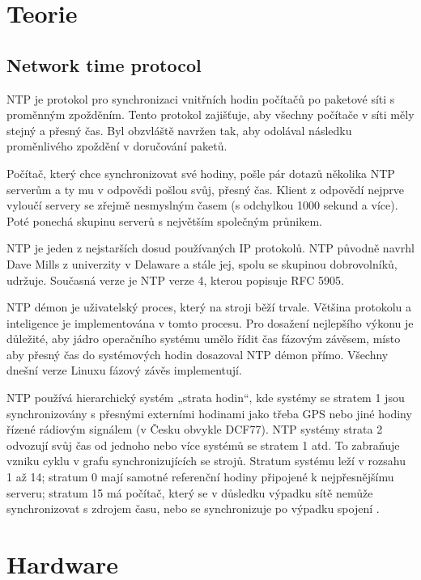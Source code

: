 \section{Teorie}
\subsection{Network time protocol}

NTP je protokol pro synchronizaci vnitřních hodin počítačů po paketové síti s proměnným zpožděním. Tento protokol zajišťuje, aby všechny počítače v síti měly stejný a přesný čas. Byl obzvláště navržen tak, aby odolával následku proměnlivého zpoždění v doručování paketů.

Počítač, který chce synchronizovat své hodiny, pošle pár dotazů několika NTP serverům a ty mu v odpovědi pošlou svůj, přesný čas. Klient z odpovědí nejprve vyloučí servery se zřejmě nesmyslným časem (s odchylkou 1000 sekund a více). Poté ponechá skupinu serverů s největším společným průnikem.

NTP je jeden z nejstarších dosud používaných IP protokolů. NTP původně navrhl Dave Mills z univerzity v Delaware a stále jej, spolu se skupinou dobrovolníků, udržuje. Současná verze je NTP verze 4, kterou popisuje RFC 5905.

NTP démon je uživatelský proces, který na stroji běží trvale. Většina protokolu a inteligence je implementována v tomto procesu. Pro dosažení nejlepšího výkonu je důležité, aby jádro operačního systému umělo řídit čas fázovým závěsem, místo aby přesný čas do systémových hodin dosazoval NTP démon přímo. Všechny dnešní verze Linuxu fázový závěs implementují.

NTP používá hierarchický systém „strata hodin“, kde systémy se stratem 1 jsou
synchronizovány s přesnými externími hodinami jako třeba GPS nebo jiné hodiny řízené
rádiovým signálem (v Česku obvykle DCF77). NTP systémy strata 2 odvozují svůj čas od
jednoho nebo více systémů se stratem 1 atd. To zabraňuje vzniku cyklu v grafu
synchronizujících se strojů. Stratum systému leží v rozsahu 1 až 14; stratum 0 mají
samotné referenční hodiny připojené k nejpřesnějšímu serveru; stratum 15 má počítač, který
se v důsledku výpadku sítě nemůže synchronizovat s zdrojem času, nebo se synchronizuje po
výpadku spojení \cite{ntp}.

\section{Hardware}

